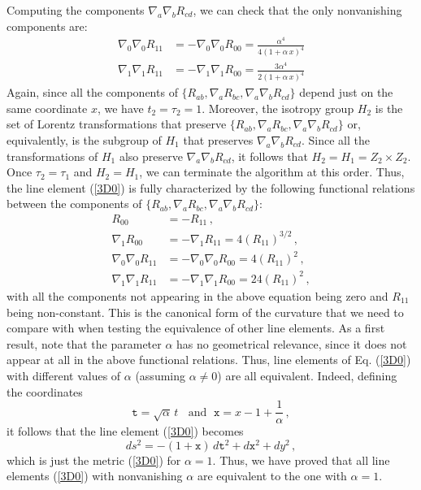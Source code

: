 \documentclass[twocolumn,prd,aps,showpacs,showkeys,amsmath,amssymb]{revtex4-1}
\begin{document}
Computing the components  $\nabla_a \nabla_b R_{cd}$, we can check that the only nonvanishing components are:
\begin{align*}
  \nabla_0  \nabla_0 R_{11} &= -   \nabla_0  \nabla_0 R_{00} =  \frac{\alpha^4}{4(1+ \alpha \,x)^4} \\
   \nabla_1  \nabla_1 R_{11} &=   - \nabla_1  \nabla_1 R_{00} = \frac{3\alpha^4}{2(1+ \alpha \,x)^4}
\end{align*}
Again, since all the components of $\{R_{ab},\nabla_a  R_{bc},\nabla_a \nabla_b R_{cd}\} $ depend just on the same coordinate $x$, we have $t_2=\tau_2=1$. Moreover, the isotropy group $H_2$ is the set of Lorentz transformations that preserve $\{R_{ab},\nabla_a  R_{bc},\nabla_a \nabla_b R_{cd}\} $ or, equivalently, is the subgroup of $H_1$ that preserves $\nabla_a \nabla_b R_{cd}$. Since all the transformations of $H_1$ also preserve $\nabla_a \nabla_b R_{cd}$, it follows that $H_2 = H_1 = Z_2\times Z_2 $. Once $\tau_2 = \tau_1$ and  $H_2 = H_1$, we can terminate the algorithm at this order.
Thus, the line element (\ref{3D0}) is fully characterized by
the following functional relations between the components of $\{R_{ab},\nabla_a  R_{bc},\nabla_a \nabla_b R_{cd}\} $:
\begin{align}
  R_{00} &= - R_{11} \,,\nonumber \\
  \nabla_1 R_{00} &= -\nabla_1 R_{11} = 4 (R_{11})^{3/2}  \,, \nonumber \\
  \nabla_0  \nabla_0 R_{11} &= -   \nabla_0  \nabla_0 R_{00} =  4 (R_{11})^2\,, \label{Funtional3D-0}\\
   \nabla_1  \nabla_1 R_{11} &= -\nabla_1  \nabla_1 R_{00} =  24 (R_{11})^2\,, \nonumber
\end{align}
with all the components not appearing in the above equation being zero and $R_{11}$ being non-constant. This is the canonical form of the curvature that we need to compare with when testing the equivalence of other line elements.  As a first result, note that the parameter $\alpha$ has no geometrical relevance, since it does not appear at all in the above functional relations. Thus, line elements of Eq. (\ref{3D0}) with different values of $\alpha$ (assuming $\alpha\neq 0$) are all equivalent. Indeed, defining the coordinates
\begin{equation*}
  \texttt{t} = \sqrt{\alpha} \,t \;\;\textrm{ and }\;  \texttt{x} = x -1 + \frac{1}{\alpha} \,,
\end{equation*}
it follows that the line element (\ref{3D0}) becomes
\begin{equation*}
  ds^2 = -(1+ \texttt{x})\,d\texttt{t}^2 +  d\texttt{x}^2 + dy^2 \,,
\end{equation*}
which is just the metric (\ref{3D0}) for $\alpha=1$. Thus, we have proved that all line elements (\ref{3D0}) with nonvanishing $\alpha$ are equivalent to the one with $\alpha=1$.
\end{document}
